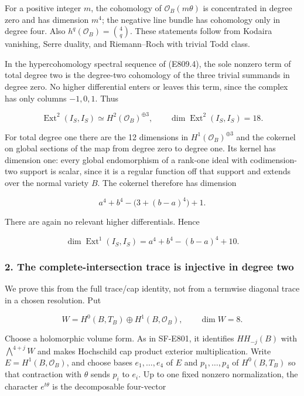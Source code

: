For a positive integer \(m\), the cohomology of
\(\mathcal O_B(m\theta)\) is concentrated in degree zero and has
dimension \(m^4\); the negative line bundle has cohomology only in
degree four. Also \(h^q(\mathcal O_B)=\binom4q\). These statements
follow from Kodaira vanishing, Serre duality, and Riemann--Roch with
trivial Todd class.

In the hypercohomology spectral sequence of (E809.4), the sole nonzero
term of total degree two is the degree-two cohomology of the three
trivial summands in degree zero. No higher differential enters or leaves
this term, since the complex has only columns \(-1,0,1\). Thus

\[
 \operatorname{Ext}^2(I_S,I_S)\simeq H^2(\mathcal O_B)^{\oplus3},
 \qquad \dim\operatorname{Ext}^2(I_S,I_S)=18.
 \tag{E809.5}
\]

For total degree one there are the 12 dimensions in
\(H^1(\mathcal O_B)^{\oplus3}\) and the cokernel on global sections of
the map from degree zero to degree one. Its kernel has dimension one:
every global endomorphism of a rank-one ideal with codimension-two
support is scalar, since it is a regular function off that support and
extends over the normal variety \(B\). The cokernel therefore has
dimension

\[
 a^4+b^4-\bigl(3+(b-a)^4\bigr)+1.
\]

There are again no relevant higher differentials. Hence

\[
 \dim\operatorname{Ext}^1(I_S,I_S)
   =a^4+b^4-(b-a)^4+10.
 \tag{E809.6}
\]

\subsubsection{2. The complete-intersection trace is injective in degree
two}\label{the-complete-intersection-trace-is-injective-in-degree-two}

We prove this from the full trace/cap identity, not from a termwise
diagonal trace in a chosen resolution. Put

\[
 W=H^0(B,T_B)\oplus H^1(B,\mathcal O_B),\qquad\dim W=8.
\]

Choose a holomorphic volume form. As in SF-E801, it identifies
\(HH_{-j}(B)\) with \(\bigwedge^{4+j}W\) and makes Hochschild cap
product exterior multiplication. Write \(E=H^1(B,\mathcal O_B)\), and
choose bases \(e_1,\ldots,e_4\) of \(E\) and \(p_1,\ldots,p_4\) of
\(H^0(B,T_B)\) so that contraction with \(\theta\) sends \(p_i\) to
\(e_i\). Up to one fixed nonzero normalization, the character
\(e^{t\theta}\) is the decomposable four-vector

